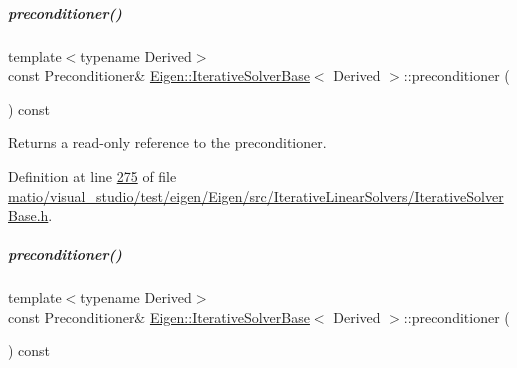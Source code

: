 \mbox{\label{group___iterative_linear_solvers___module_a709a056e17c49b5272e4971bc376cbe4}} 
\subparagraph{\texorpdfstring{preconditioner()}{preconditioner()}\hspace{0.1cm}{\footnotesize\ttfamily [3/4]}}
{\footnotesize\ttfamily template$<$typename Derived$>$ \\
const Preconditioner\& \hyperlink{group___iterative_linear_solvers___module_class_eigen_1_1_iterative_solver_base}{Eigen\+::\+Iterative\+Solver\+Base}$<$ Derived $>$\+::preconditioner (\begin{DoxyParamCaption}{ }\end{DoxyParamCaption}) const\hspace{0.3cm}{\ttfamily [inline]}}

\begin{DoxyReturn}{Returns}
a read-\/only reference to the preconditioner. 
\end{DoxyReturn}


Definition at line \hyperlink{matio_2visual__studio_2test_2eigen_2_eigen_2src_2_iterative_linear_solvers_2_iterative_solver_base_8h_source_l00275}{275} of file \hyperlink{matio_2visual__studio_2test_2eigen_2_eigen_2src_2_iterative_linear_solvers_2_iterative_solver_base_8h_source}{matio/visual\+\_\+studio/test/eigen/\+Eigen/src/\+Iterative\+Linear\+Solvers/\+Iterative\+Solver\+Base.\+h}.

\mbox{\label{group___iterative_linear_solvers___module_a709a056e17c49b5272e4971bc376cbe4}} 
\subparagraph{\texorpdfstring{preconditioner()}{preconditioner()}\hspace{0.1cm}{\footnotesize\ttfamily [4/4]}}
{\footnotesize\ttfamily template$<$typename Derived$>$ \\
const Preconditioner\& \hyperlink{group___iterative_linear_solvers___module_class_eigen_1_1_iterative_solver_base}{Eigen\+::\+Iterative\+Solver\+Base}$<$ Derived $>$\+::preconditioner (\begin{DoxyParamCaption}{ }\end{DoxyParamCaption}) const\hspace{0.3cm}{\ttfamily [inline]}}

